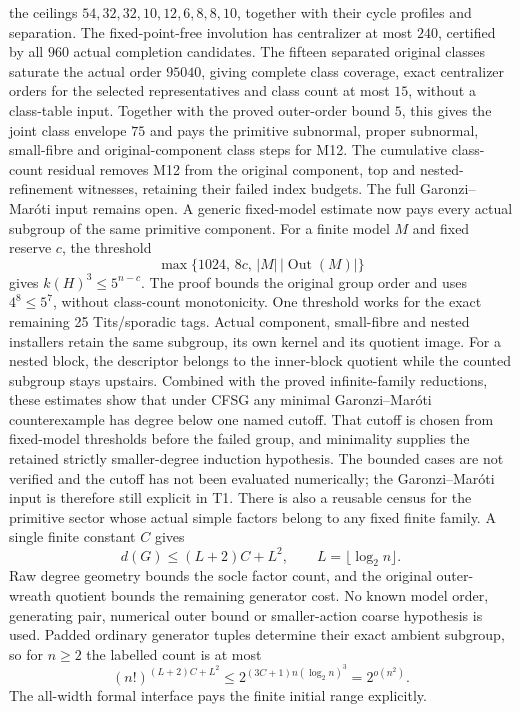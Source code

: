 the ceilings $54,32,32,10,12,6,8,8,10$, together with their cycle profiles
and separation. The fixed-point-free involution has centralizer at most
$240$, certified by all $960$ actual completion candidates. The fifteen
separated original classes saturate the actual order $95040$, giving
complete class coverage, exact centralizer orders for the selected
representatives and class count at most $15$, without a class-table input.
Together with the proved outer-order bound $5$, this gives the joint
class envelope $75$ and pays the primitive subnormal, proper subnormal,
small-fibre and original-component class steps for M12. The cumulative
class-count residual removes M12 from the original component, top and
nested-refinement witnesses, retaining their failed index budgets. The
full Garonzi--Mar\'oti input remains open.
A generic fixed-model estimate now pays every actual subgroup of the same
primitive component. For a finite model $M$ and fixed reserve $c$, the
threshold
\[
 \max\{1024,\,8c,\,|M|\,|\operatorname{Out}(M)|\}
\]
gives $k(H)^3\le5^{n-c}$. The proof bounds the original group order and
uses $4^8\le5^7$, without class-count monotonicity. One threshold works
for the exact remaining 25 Tits/sporadic tags. Actual component,
small-fibre and nested installers retain the same subgroup, its own
kernel and its quotient image. For a nested block, the descriptor belongs
to the inner-block quotient while the counted subgroup stays upstairs.
Combined with the proved infinite-family reductions, these estimates
show that under CFSG any minimal Garonzi--Mar\'oti counterexample has
degree below one named cutoff. That cutoff is chosen from fixed-model
thresholds before the failed group, and minimality supplies the retained
strictly smaller-degree induction hypothesis. The bounded cases are
not verified and the cutoff has not been evaluated numerically; the
Garonzi--Mar\'oti input is therefore still explicit in T1.
There is also a reusable census for the primitive sector whose actual
simple factors belong to any fixed finite family. A single finite
constant $C$ gives
\[
 d(G)\le (L+2)C+L^2,\qquad L=\lfloor\log_2 n\rfloor.
\]
Raw degree geometry bounds the socle factor count, and the original
outer-wreath quotient bounds the remaining generator cost. No known
model order, generating pair, numerical outer bound or smaller-action
coarse hypothesis is used. Padded ordinary generator tuples determine
their exact ambient subgroup, so for $n\ge2$ the labelled count is at most
\[
 (n!)^{(L+2)C+L^2}
 \le 2^{(3C+1)n(\log_2 n)^3}=2^{o(n^2)}.
\]
The all-width formal interface pays the finite initial range explicitly.
